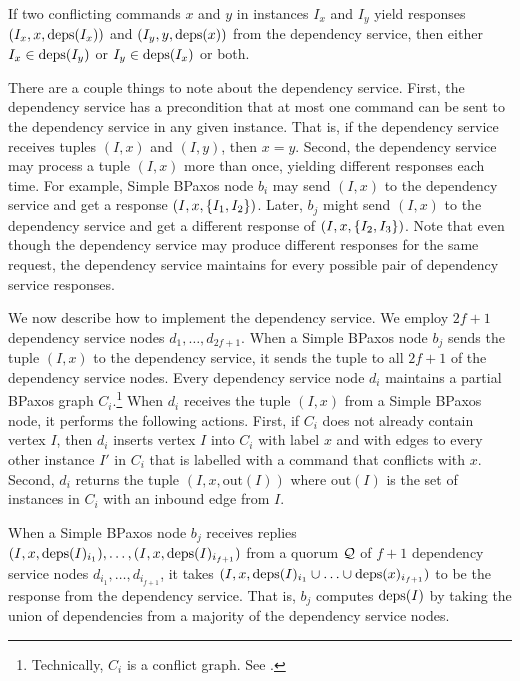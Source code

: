 \begin{invariant}
If two conflicting commands $x$ and $y$ in instances $I_x$ and $I_y$ yield
responses $(I_x, x, \text{deps}(I_x))$ and $(I_y, y, \text{deps}(x))$ from the dependency
service, then either $I_x \in \text{deps}(I_y)$ or $I_y \in \text{deps}(I_x)$ or both.
\end{invariant}

There are a couple things to note about the dependency service.
%
First, the dependency service has a precondition that at most one command can
be sent to the dependency service in any given instance. That is, if the
dependency service receives tuples $(I, x)$ and $(I, y)$, then $x = y$.
%
Second, the dependency service may process a tuple $(I, x)$ more than once,
yielding different responses each time. For example, Simple BPaxos node $b_i$
may send $(I, x)$ to the dependency service and get a response $(I, x,
\{I_1, I_2\})$. Later, $b_j$ might send $(I, x)$ to the dependency service
and get a different response of $(I, x, \{I_2, I_3\})$. Note that even though
the dependency service may produce different responses for the same request,
the dependency service maintains  for every possible
pair of dependency service responses.

\newcommand{\out}[1]{\text{out}(#1)}
We now describe how to implement the dependency service. We employ $2f + 1$
dependency service nodes $d_{1}, \ldots, d_{2f + 1}$. When a Simple BPaxos node
$b_j$ sends the tuple $(I, x)$ to the dependency service, it sends the tuple to
all $2f + 1$ of the dependency service nodes. Every dependency service node
$d_i$ maintains a partial BPaxos graph $C_i$.\footnote{Technically, $C_i$ is a
conflict graph. See .} When $d_i$ receives the tuple
$(I, x)$ from a Simple BPaxos node, it performs the following actions.
%
First, if $C_i$ does not already contain vertex $I$, then $d_i$ inserts vertex
$I$ into $C_i$ with label $x$ and with edges to every other instance $I'$ in
$C_i$ that is labelled with a command that conflicts with $x$.
%
Second, $d_i$ returns the tuple $(I, x, \out{I})$ where $\out{I}$ is the set of
instances in $C_i$ with an inbound edge from $I$.

When a Simple BPaxos node $b_j$ receives replies $(I, x, \text{deps}(I)_{i_1}),
\ldots, (I, x, \text{deps}(I)_{i_{f+1}})$ from a quorum $\mathcal{Q}$ of $f + 1$
dependency service nodes $d_{i_1}, \ldots, d_{i_{f+1}}$, it takes $(I, x,
\text{deps}(I)_{i_1} \cup \ldots \cup \text{deps}(x)_{i_{f+1}})$ to be the response from
the dependency service. That is, $b_j$ computes $\text{deps}(I)$ by taking the union
of dependencies from a majority of the dependency service nodes.

